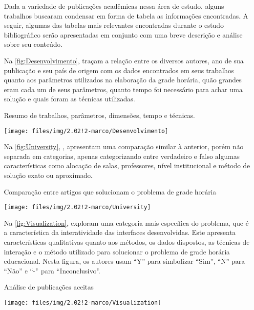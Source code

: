 Dada a variedade de publicações acadêmicas nessa área de estudo, alguns trabalhos buscaram condensar em forma de tabela as informações encontradas. A seguir, algumas das tabelas mais relevantes encontradas durante o estudo bibliográfico serão apresentadas em conjunto com uma breve descrição e análise sobre seu conteúdo.

Na \autoref{fig:Desenvolvimento},  traçam a relação entre os diversos autores, ano de sua publicação e seu país de origem com os dados encontrados em seus trabalhos quanto aos parâmetros utilizados na elaboração da grade horária, quão grandes eram cada um de seus parâmetros, quanto tempo foi necessário para achar uma solução e quais foram as técnicas utilizadas.


\begin{CenteredFigure} \caption{Resumo de trabalhos, parâmetros, dimensões, tempo e técnicas.} \label{fig:Desenvolvimento}
  \texttt{[image: files/img/2.02!2-marco/Desenvolvimento]}
\end{CenteredFigure}    %

Na \autoref{fig:University}, , apresentam uma comparação similar à anterior, porém não separada em categorias, apenas categorizando entre verdadeiro e falso algumas características como alocação de salas, professores, nível institucional e método de solução exato ou aproximado.

\begin{CenteredFigure} \caption{Comparação entre artigos que solucionam o problema de grade horária} \label{fig:University}
  \texttt{[image: files/img/2.02!2-marco/University]}
\end{CenteredFigure}    %

Na \autoref{fig:Visualization},  exploram uma categoria mais específica do problema, que é a característica da interatividade das interfaces desenvolvidas. Este apresenta características qualitativas quanto aos métodos, os dados dispostos, as técnicas de interação e o método utilizado para solucionar o problema de grade horária educacional. Nesta figura, os autores usam ``Y'' para simbolizar ``Sim'', ``N'' para ``Não'' e ``-'' para ``Inconclusivo''.

\begin{CenteredFigure} \caption{Análise de publicações aceitas} \label{fig:Visualization}
  \texttt{[image: files/img/2.02!2-marco/Visualization]}
\end{CenteredFigure}    %

